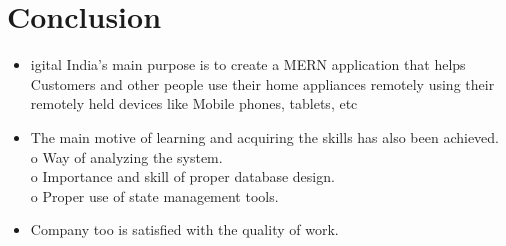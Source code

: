 
\section{Conclusion}

\begin{itemize}
\item	igital India’s main purpose is to create a MERN application that helps Customers and other people use their home appliances remotely using their remotely held devices like Mobile phones, tablets, etc
\item	 The main motive of learning and acquiring the skills has also been achieved. \\
o	Way of analyzing the system.\\

o	Importance and skill of proper database design.\\
o	Proper use of state management tools.\\


\item	Company too is satisfied with the quality of work.

\end{itemize}